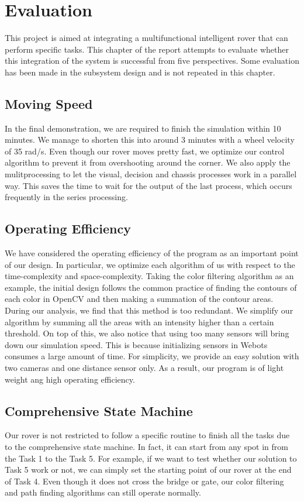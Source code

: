 \chapter{Evaluation\label{chap5}}
This project is aimed at integrating a multifunctional intelligent rover that can perform specific tasks. This chapter of the report attempts to evaluate whether this integration of the system is successful from five perspectives. Some evaluation has been made in the subsystem design and is not repeated in this chapter.

\section{Moving Speed}
In the final demonstration, we are required to finish the simulation within 10 minutes. We manage to shorten this into around 3 minutes with a wheel velocity of 35 rad/s. Even though our rover moves pretty fast, we optimize our control algorithm to prevent it from overshooting around the corner. We also apply the mulitprocessing to let the visual, decision and chassis processes work in a parallel way. This saves the time to wait for the output of the last process, which  occurs frequently in the series processing.

\section{Operating Efficiency}
We have considered the operating efficiency of the program as an important point of our design. In particular, we optimize each algorithm of us with respect to the time-complexity and space-complexity. Taking the color filtering algorithm as an example, the initial design follows the common practice of finding the contours of each color in OpenCV and then making a summation of the contour areas. During our analysis, we find that this method is too redundant. We simplify our algorithm by summing all the areas with an intensity higher than a certain threshold. On top of this, we also notice that using too many sensors will bring down our simulation speed. This is because initializing sensors in Webots consumes a large amount of time. For simplicity, we provide an easy solution with two cameras and one distance sensor only. As a result, our program is of light weight ang high operating efficiency.

\section{Comprehensive State Machine}
Our rover is not restricted to follow a specific routine to finish all the tasks due to the comprehensive state machine. In fact, it can start from any spot in from the Task 1 to the Task 5. For example, if we want to test whether our solution to Task 5 work or not, we can simply set the starting point of our rover at the end of Task 4. Even though it does not cross the bridge or gate, our color filtering and path finding algorithms can still operate normally.

